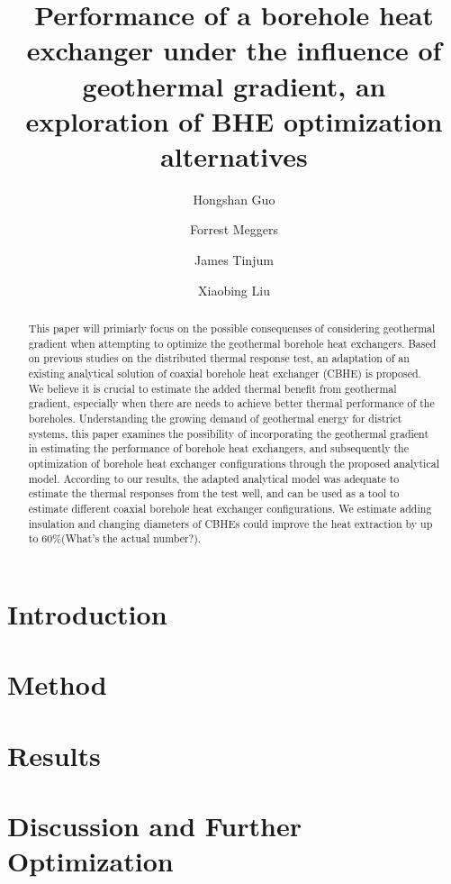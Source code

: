 \documentclass[3p]{elsarticle/elsarticle}
\begin{document}
\begin{frontmatter}
\title{Performance of a borehole heat exchanger under the influence of geothermal gradient, an exploration of BHE optimization alternatives}
\author[Group1]{Hongshan Guo}



\author[Group2]{Forrest Meggers}


\author[Group3]{James Tinjum}
\author[Group4]{Xiaobing Liu}

\address[Group1]{Andlinger Center for Energy and the Environment, Princeton University, Princeton, United States}
\address[Group2]{School of Architecture, Princeton University, Princeton, United States}



\begin{abstract}
This paper will primiarly focus on the possible consequenses of considering geothermal gradient when attempting to optimize the geothermal borehole heat exchangers. Based on previous studies on the distributed thermal response test, an adaptation of an existing analytical solution of coaxial borehole heat exchanger (CBHE) is proposed. We believe it is crucial to estimate the added thermal benefit from geothermal gradient, especially when there are needs to achieve better thermal performance of the boreholes. Understanding the growing demand of geothermal energy for district systems, this paper examines the possibility of incorporating the geothermal gradient in estimating the performance of borehole heat exchangers, and subsequently the optimization of borehole heat exchanger configurations through the proposed analytical model. According to our results, the adapted analytical model was adequate to estimate the thermal responses from the test well, and can be used as a tool to estimate different coaxial borehole heat exchanger configurations. We estimate adding insulation and changing diameters of CBHEs could improve the heat extraction by up to 60\%(What's the actual number?).\end{abstract}
\begin{keyword}

\end{keyword}

\end{frontmatter}
\tableofcontents
\section{Introduction}

\section{Method}
	
	
\section{Results}
	
\section{Discussion and Further Optimization}
	
\renewcommand\refname{References}

\end{document}
